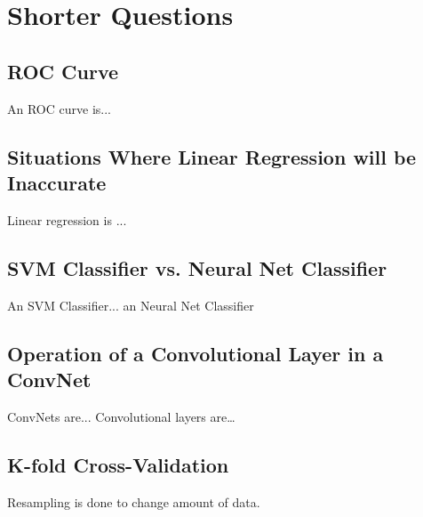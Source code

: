 
\section{Shorter Questions}

\subsection{ROC Curve}
An ROC curve is...

\subsection{Situations Where Linear Regression will be Inaccurate}
Linear regression is ... 

\subsection{SVM Classifier vs. Neural Net Classifier}
An SVM Classifier... an Neural Net Classifier

\subsection{Operation of a Convolutional Layer in a ConvNet}
ConvNets are... Convolutional layers are\dots

\subsection{K-fold Cross-Validation}
Resampling is done to change amount of data.

